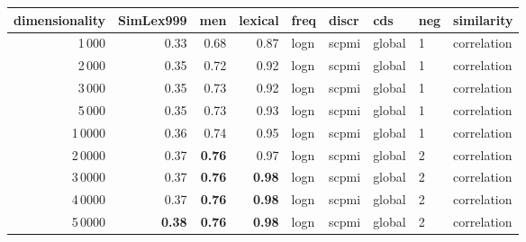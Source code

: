 \begin{tabular}{rrrrlllll}
\toprule
 dimensionality &  SimLex999 &   men &  lexical &  freq &  discr &     cds & neg &   similarity \\
\midrule
           1\,000 &       0.33 &  0.68 &     0.87 &  logn &  scpmi &  global &   1 &  correlation \\
           2\,000 &       0.35 &  0.72 &     0.92 &  logn &  scpmi &  global &   1 &  correlation \\
           3\,000 &       0.35 &  0.73 &     0.92 &  logn &  scpmi &  global &   1 &  correlation \\
           5\,000 &       0.35 &  0.73 &     0.93 &  logn &  scpmi &  global &   1 &  correlation \\
          1\,0000 &       0.36 &  0.74 &     0.95 &  logn &  scpmi &  global &   1 &  correlation \\
          2\,0000 &       0.37 &  \textbf{0.76} &     0.97 &  logn &  scpmi &  global &   2 &  correlation \\
          3\,0000 &       0.37 &  \textbf{0.76} &     \textbf{0.98} &  logn &  scpmi &  global &   2 &  correlation \\
          4\,0000 &       0.37 &  \textbf{0.76} &     \textbf{0.98} &  logn &  scpmi &  global &   2 &  correlation \\
          5\,0000 &       \textbf{0.38} &  \textbf{0.76} &     \textbf{0.98} &  logn &  scpmi &  global &   2 &  correlation \\
\bottomrule
\end{tabular}
